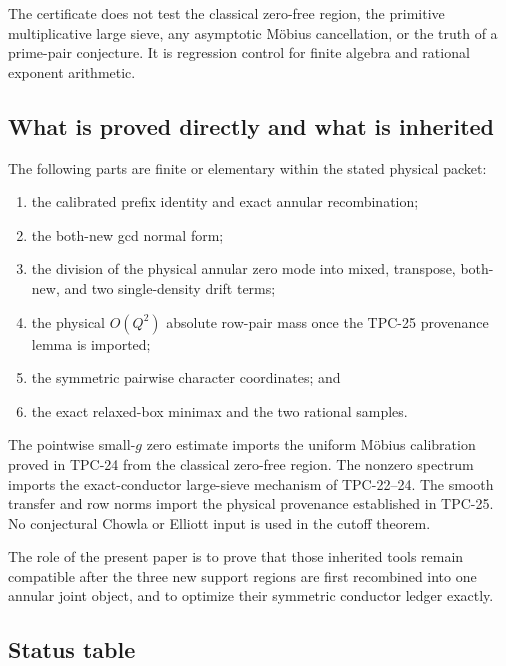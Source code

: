 The certificate does not test the classical zero-free region, the
primitive multiplicative large sieve, any asymptotic M\"obius
cancellation, or the truth of a prime-pair conjecture.  It is regression
control for finite algebra and rational exponent arithmetic.

\subsection{What is proved directly and what is inherited}

The following parts are finite or elementary within the stated
physical packet:

\begin{enumerate}[label=\textup{(\roman*)}]
 \item the calibrated prefix identity and exact annular recombination;
 \item the both-new gcd normal form;
 \item the division of the physical annular zero mode into mixed,
 transpose, both-new, and two single-density drift terms;
 \item the physical \(O(Q^2)\) absolute row-pair mass once the
 TPC-25 provenance lemma is imported;
 \item the symmetric pairwise character coordinates; and
 \item the exact relaxed-box minimax and the two rational samples.
\end{enumerate}

The pointwise small-\(g\) zero estimate imports the uniform M\"obius
calibration proved in TPC-24 from the classical zero-free region.  The
nonzero spectrum imports the exact-conductor large-sieve mechanism of
TPC-22--24.  The smooth transfer and row norms import the physical
provenance established in TPC-25.  No conjectural Chowla or Elliott
input is used in the cutoff theorem.

The role of the present paper is to prove that those inherited tools
remain compatible after the three new support regions are first
recombined into one annular joint object, and to optimize their
symmetric conductor ledger exactly.

\subsection{Status table}

